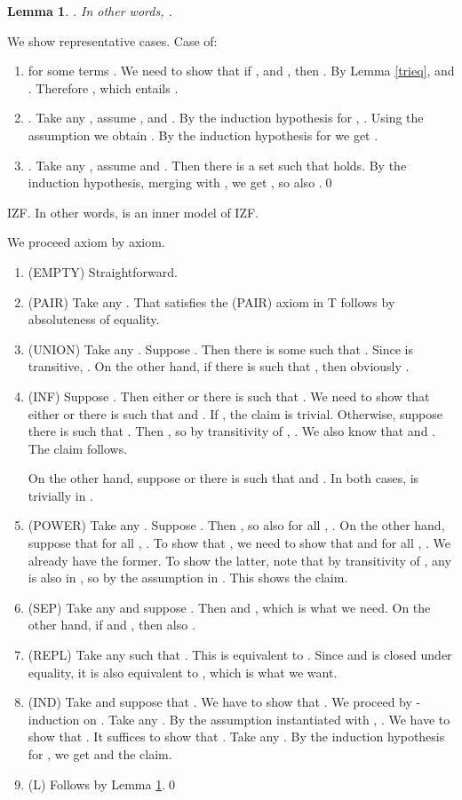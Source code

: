 \documentclass{LMCS}
\newtheorem{lemma}[thm]{Lemma}
\newcommand{\izfr}{IZF}
\begin{document}
\begin{lemma}\label{tril}
. In other words, . 
\end{lemma}
\proof We show representative cases. Case  of:
\begin{enumerate}[]
\item  for some terms . We need to show
that if ,  and , then . By Lemma \ref{trieq},  and .
Therefore , which entails .
\item . Take any , assume ,   and . By the induction
hypothesis for ,  . Using the assumption we
obtain . By the induction hypothesis for  we get 
. 
\item . Take any ,
assume  and . Then there is
a set  such that  holds. By the induction
hypothesis, merging  with , we get , so also .\qed
\end{enumerate}


\begin{thm}\label{tlsmodel}
\izfr. In other words,  is an inner model of \izfr. 
\end{thm}
\proof We proceed axiom by axiom. 
\begin{enumerate}[]
\item (EMPTY) Straightforward. 
\item (PAIR) Take any . That  satisfies the (PAIR) axiom in T 
follows by absoluteness of equality.
\item (UNION) Take any . Suppose . Then there is
some  such that . Since  is transitive, . On the
other hand, if there is  such that , then obviously . 
\item (INF) Suppose . Then either  or there is  such that . We need to show that either  or there
is  such that  and . If , the claim
is trivial. Otherwise, suppose there is  such that .
Then , so by transitivity of , . 
We also know that  and . The claim follows. 

On the other hand, suppose  or there is  such that  and . In both cases,  is trivially in . 
\item (POWER) Take any . Suppose . Then , so also for all , . On the other hand,
suppose that for all , .  
To show that , we need to show that  and for all , . We already have the former. To show the latter, note that by
transitivity of , any  is also in , so by the assumption in
. This shows the claim.
\item (SEP) Take any  and suppose . Then  and , which is what we need. 
On the other hand, if  and , then
also .
\item (REPL) Take any  such that
. This is equivalent to 
.
Since  and  is closed under equality, it is also equivalent to , which is what we want. 
\item (IND) Take  and suppose that . We have to
show that .
We proceed by -induction on . Take any . By the assumption
instantiated with , . We have to show that . It suffices to show 
that . Take any . By the induction hypothesis for , we get  and
the claim.
\item (L) Follows by Lemma \ref{tril}.\qed
\end{enumerate}
\end{document}
